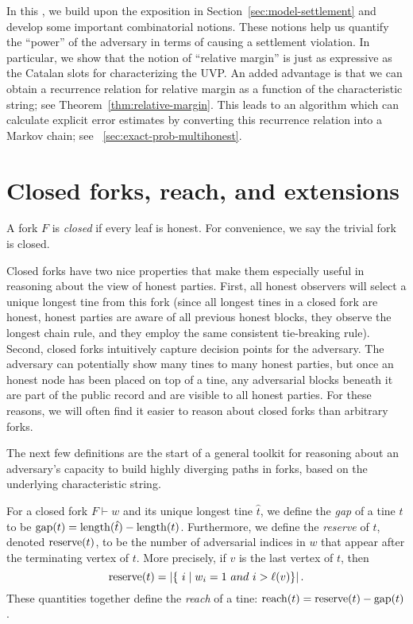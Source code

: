 
In this \Section, 
we build upon the exposition in Section~\ref{sec:model-settlement} 
and develop some important combinatorial notions. 
These notions help us quantify the ``power'' of the adversary 
in terms of causing a settlement violation. 
In particular, we show that the notion of ``relative margin'' is just as expressive 
as the Catalan slots for characterizing the UVP. 
An added advantage is that we can obtain a recurrence relation 
for relative margin as a function of the characteristic string; 
see Theorem~\ref{thm:relative-margin}. 
This leads to an algorithm which can calculate explicit error estimates by converting 
this recurrence relation into a Markov chain; see \Section~\ref{sec:exact-prob-multihonest}.


\section{Closed forks, reach, and extensions}
\begin{definition}
  A fork $F$ is \emph{closed} if every leaf is honest. For convenience, we say the trivial fork is closed.
\end{definition}
Closed forks have two nice properties that make them especially useful in reasoning about the view of honest parties.
First, 
all honest observers will select a unique longest tine from this fork 
(since all longest tines in a closed fork are honest, 
honest parties are aware of all previous honest blocks, 
they observe the longest chain rule, and they employ the same consistent tie-breaking rule).  
Second, 
closed forks intuitively capture decision points for the adversary.
The adversary can potentially show many tines to many honest parties, 
but once an honest node has been placed on top of 
a tine, any adversarial blocks beneath it are part of the public record and are visible to all honest parties. 
For these
reasons, we will often find it easier to reason about closed forks than arbitrary forks. %

The next few definitions are the start of a general toolkit for reasoning about an adversary's capacity to build highly diverging paths in forks, based on the underlying characteristic string.

\begin{definition}\label{def:gap-reserve-reach-mh}
For a closed fork $F \vdash w$ and its unique longest tine $\hat{t}$, we define the \emph{gap} of a tine $t$ to be $\operatorname{gap}(t)=\operatorname{length}(\hat{t})-\operatorname{length}(t)$.
Furthermore, we define the \emph{reserve} of $t$, denoted $\operatorname{reserve}(t)$, to be the number of adversarial indices in $w$ that appear after the terminating vertex of $t$. More precisely, if $v$ is the last vertex of $t$, then
\[
  \reserve(t)=|\{\ i \mid w_i=1 \ and \ i > \ell(v)\}|\,.
  \]
These quantities together define the \emph{reach} of a tine: $
\operatorname{reach}(t)=\operatorname{reserve}(t)-\operatorname{gap}(t)$.
\end{definition}

